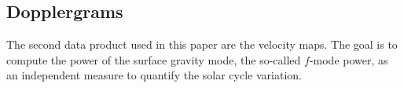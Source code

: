 \documentclass{aa}
\begin{document}



\subsection{Dopplergrams}

The second data product used in this paper are the \los{} velocity maps. The goal is to compute the power of the surface gravity mode, the so-called $f$-mode power, as an independent measure to quantify the solar cycle variation.
\end{document}
